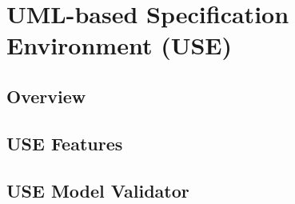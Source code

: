 \section{UML-based Specification Environment (USE)}

\subsection{Overview}

\subsection{USE Features}

\subsection{USE Model Validator}


